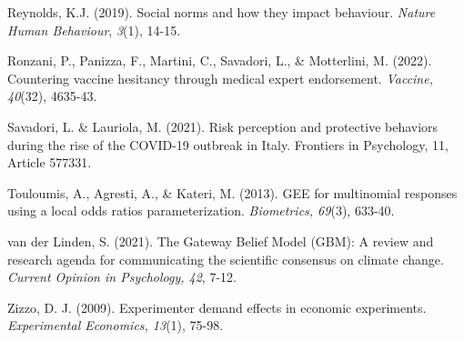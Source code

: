\documentclass[authordate, empirical]{jote-new-article}
\begin{document}
	Reynolds, K.J. (2019). Social norms and how they impact behaviour. \emph{Nature Human Behaviour}, \emph{3}(1), 14-15.







	Ronzani, P., Panizza, F., Martini, C., Savadori, L., \& Motterlini, M. (2022). Countering vaccine hesitancy through medical expert endorsement. \emph{Vaccine, 40}(32), 4635-43.







	Savadori, L. \& Lauriola, M. (2021). Risk perception and protective behaviors during the rise of the COVID-19 outbreak in Italy. Frontiers in Psychology, 11, Article 577331.







	Touloumis, A., Agresti, A., \& Kateri, M. (2013). GEE for multinomial responses using a local odds ratios parameterization. \emph{Biometrics, 69}(3), 633-40.







	van der Linden, S. (2021). The Gateway Belief Model (GBM): A review and research agenda for communicating the scientific consensus on climate change. \emph{Current Opinion in Psychology, 42}, 7-12.







	Zizzo, D. J. (2009). Experimenter demand effects in economic experiments. \emph{Experimental Economics, 13}(1), 75-98.
\end{document}
